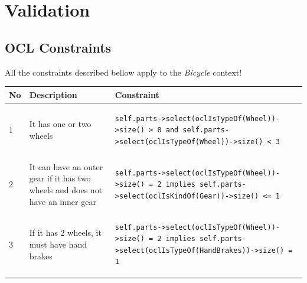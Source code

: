 \section{Validation}
\label{appendix.validation}

\subsection{OCL Constraints}
\label{appendix.ocl_constraints}
All the constraints described bellow apply to the \emph{Bicycle} context! 

\begin{table}[htp]
\begin{center}
	\lstset{captionpos=b,language=OCL,numbers=none,basicstyle=\small}
	\lstset{linewidth=0.60\textwidth}
	\begin{tabular*}{\textwidth}{p{} p{}
	l{}} \hline \hline \textbf{No} & \textbf{Description} &
	\textbf{Constraint} \\ \hline \hline 1	&	It has one or two wheels &
\begin{lstlisting}
self.parts->select(oclIsTypeOf(Wheel))->size() > 0 and self.parts->select(oclIsTypeOf(Wheel))->size() < 3
\end{lstlisting}  \\ \hline

2	&	It can have an outer gear if it has two wheels and does not have an inner gear &
\begin{lstlisting}
self.parts->select(oclIsTypeOf(Wheel))->size() = 2 implies self.parts->select(oclIsKindOf(Gear))->size() <= 1
\end{lstlisting}  \\ \hline

3	&	If it has 2 wheels, it must have hand brakes &
\begin{lstlisting}
self.parts->select(oclIsTypeOf(Wheel))->size() = 2 implies self.parts->select(oclIsTypeOf(HandBrakes))->size() = 1 \end{lstlisting}  \\ \hline


\end{tabular*}
\end{center}
\end{table}

